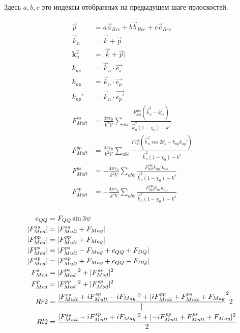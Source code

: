 \documentclass[12pt,a4paper,draft]{article}
\begin{document}
Здесь $a, b, c$ это индексы отобранных на предыдущем шаге прлоскостей.

\begin{align}
    \vec{p} &= a \vec{a}_{Rec} + b \vec{b}_{Rec} + c \vec{c}_{Rec} \\
    \vec{k}_n &= \vec{k} + \vec{p} \\
    \mathbf{k}_n^2 & = \lvert \vec{k} + \vec{p} \rvert \\
    k_{ns} &= \vec{k}_n \cdot \vec{e_s} \\
    k_{np} &= \vec{k}_n \cdot \vec{e_p} \\
    k_{np}' &= \vec{k}_n \cdot \vec{e_p'} \\
    F_{Mult}^{ss} &= \frac{4 \pi r_0}{k^2 V} \sum_{abc} \frac{F_{hkl}^{abc} (\vec{k}_n^2 - k_{ns}^2)}{\vec{k}_n^2 (1 - \chi_0) - k^2} \\
    F_{Mult}^{pp} &= \frac{4 \pi r_0}{k^2 V} \sum_{abc} \frac{F_{hkl}^{abc} (\vec{k}_n^2 \cos 2\theta_b - k_{np}k_{np}')}{\vec{k}_n^2 (1 - \chi_0) - k^2} \\
    F_{Mult}^{ps} &= - \frac{4 \pi r_0}{k^2 V} \sum_{abc} \frac{F_{hkl}^{abc} k_{np}'k_{ns}}{\vec{k}_n^2 (1 - \chi_0) - k^2} \\
    F_{Mult}^{sp} &= - \frac{4 \pi r_0}{k^2 V} \sum_{abc} \frac{F_{hkl}^{abc} k_{ns}k_{np}}{\vec{k}_n^2 (1 - \chi_0) - k^2} \\
\end{align}

\begin{align}
    c_{QQ} &= F_{QQ} \sin 3 \psi \\
    \lvert F_{Mod}^{ss} \rvert &= \lvert F_{Mult}^{ss} + F_{Mag} \rvert \\
    \lvert F_{Mod}^{pp} \rvert &= \lvert F_{Mult}^{pp} + F_{Mag} \rvert \\
    \lvert F_{Mod}^{ps} \rvert &= \lvert F_{Mult}^{ps} - F_{Mag} + c_{QQ} + F_{DQ} \rvert \\
    \lvert F_{Mod}^{sp} \rvert &= \lvert F_{Mult}^{sp} + F_{Mag} + c_{QQ} - F_{DQ} \rvert \\
    F_{Mod}^s &= \lvert F_{Mod}^{ps} \rvert^2 + \lvert F_{Mod}^{ss} \rvert^2 \\
    F_{Mod}^p &= \lvert F_{Mod}^{pp} \rvert^2 + \lvert F_{Mod}^{sp} \rvert^2 \\
    Rr2 &= \frac{\lvert F_{Mult}^{ss} + i F_{Mult}^{sp} - i F_{Mag} \rvert^2 + \lvert i F_{Mult}^{pp} + F_{Mult}^{ps} + F_{Mag}} \rvert^2{2} \\
    Rl2 &= \frac{\lvert F_{Mult}^{ss} - i F_{Mult}^{sp} + i F_{Mag} \rvert^2 + \lvert -i F_{Mult}^{pp} + F_{Mult}^{ps} + F_{Mag} \rvert^2}{2}
\end{align}

\printbibliography
\end{document}
